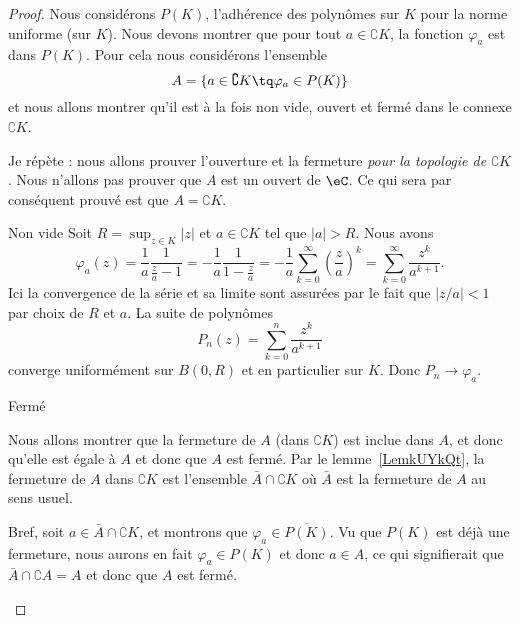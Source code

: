 \begin{proof}
	Nous considérons \( P(K)\), l'adhérence des polynômes sur \( K\) pour la norme uniforme (sur \( K\)). Nous devons montrer que pour tout \( a\in \complement K\), la fonction \( \varphi_a\) est dans \( P(K)\). Pour cela nous considérons l'ensemble
	\begin{equation}
		A=\{ a\in\complement K\tq \varphi_a\in P(K) \}
	\end{equation}
	et nous allons montrer qu'il est à la fois non vide, ouvert et fermé dans le connexe \( \complement K\).

	Je répète : nous allons prouver l'ouverture et la fermeture \emph{pour la topologie de \( \complement K\)}. Nous n'allons pas prouver que \( A\) est un ouvert de \( \eC\). Ce qui sera par conséquent prouvé est que \( A=\complement K\).

	\begin{subproof}
		\item[Non vide] Soit \( R=\sup_{z\in K}| z |\) et \( a\in \complement K\) tel que \( | a |>R\). Nous avons
		\begin{equation}
			\varphi_a(z)=\frac{1}{ a }\frac{1}{ \frac{ z }{ a }-1 }
			=-\frac{1}{ a }\frac{1}{ 1-\frac{ z }{ a } }
			=-\frac{1}{ a }\sum_{k=0}^{\infty}\left( \frac{ z }{ a } \right)^k
			=\sum_{k=0}^{\infty}\frac{ z^k }{ a^{k+1} }.
		\end{equation}
		Ici la convergence de la série et sa limite sont assurées par le fait que \( | z/a |<1\) par choix de \( R\) et \( a\). La suite de polynômes
		\begin{equation}
			P_n(z)=\sum_{k=0}^n\frac{ z^k }{ a^{k+1} }
		\end{equation}
		converge uniformément sur \( B(0,R)\) et en particulier sur \( K\). Donc \( P_n\to \varphi_a\).

		\item[Fermé]

		Nous allons montrer que la fermeture de \( A\) (dans \( \complement K\)) est inclue dans \( A\), et donc qu'elle est égale à \( A\) et donc que \( A\) est fermé. Par le lemme~\ref{LemkUYkQt}, la fermeture de \( A\) dans \( \complement K\) est l'ensemble \( \bar A\cap\complement K\) où \( \bar A\) est la fermeture de \( A\) au sens usuel.

		Bref, soit \( a\in \bar A\cap\complement K\), et montrons que \( \varphi_a\in \overline{ P(K) }\). Vu que \( P(K)\) est déjà une fermeture, nous aurons en fait \( \varphi_a\in P(K)\) et donc \( a\in A\), ce qui signifierait que \( \bar A\cap\complement A=A\) et donc que \( A\) est fermé.


\end{subproof}
\end{proof}
